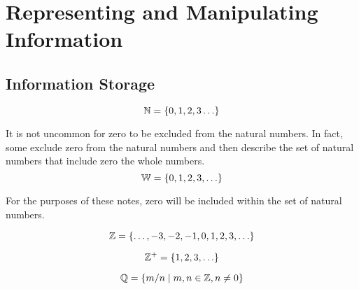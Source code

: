 \documentclass[20150903-160354-rs2.2-MarksMathNotebook.tex]{subfiles}
\begin{document}
%
%

\chapter{Representing and Manipulating Information}



\section{Information Storage}

\begin{definition}

\[
\mathbb{N}=\left\{0, 1, 2, 3 \ldots\right\}
\]

\end{definition}

\begin{remark}
It is not uncommon for zero to be excluded from the natural numbers.  In fact, some exclude zero from the natural numbers and then describe the set of natural numbers that include zero the whole numbers. \\

\[
\mathbb{W}=\left\{0, 1, 2, 3, \ldots\right\}
\]

For the purposes of these notes, zero will be included within the set of natural numbers.
\end{remark}

\begin{definition}[Integers]

\[
\mathbb{Z}=\left\{\ldots, -3, -2, -1, 0, 1, 2, 3, \ldots\right\}
\]

\end{definition}

\begin{definition}

\[
\mathbb{Z}^{+}=\left\{1, 2, 3, \ldots\right\}
\]
\end{definition}

\begin{definition}

\[
\mathbb{Q}=\set{m/n \suchthat m,n \in \mathbb{Z}, n \ne 0}
\]
\end{definition}
\end{document}
